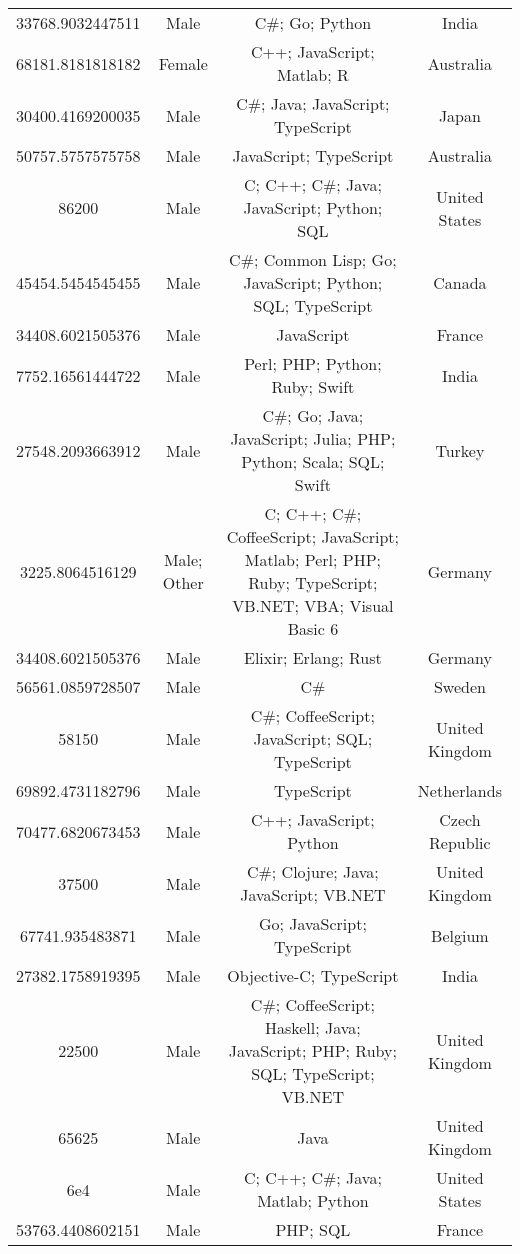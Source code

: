 \begin{center}
\begin{tabular}{ |c|c|c|c| }
33768.9032447511  &  Male  &  C\#; Go; Python  &  India  \\ 
68181.8181818182  &  Female  &  C++; JavaScript; Matlab; R  &  Australia  \\ 
30400.4169200035  &  Male  &  C\#; Java; JavaScript; TypeScript  &  Japan  \\ 
50757.5757575758  &  Male  &  JavaScript; TypeScript  &  Australia  \\ 
86200  &  Male  &  C; C++; C\#; Java; JavaScript; Python; SQL  &  United States  \\ 
45454.5454545455  &  Male  &  C\#; Common Lisp; Go; JavaScript; Python; SQL; TypeScript  &  Canada  \\ 
34408.6021505376  &  Male  &  JavaScript  &  France  \\ 
7752.16561444722  &  Male  &  Perl; PHP; Python; Ruby; Swift  &  India  \\ 
27548.2093663912  &  Male  &  C\#; Go; Java; JavaScript; Julia; PHP; Python; Scala; SQL; Swift  &  Turkey  \\ 
3225.8064516129  &  Male; Other  &  C; C++; C\#; CoffeeScript; JavaScript; Matlab; Perl; PHP; Ruby; TypeScript; VB.NET; VBA; Visual Basic 6  &  Germany  \\ 
34408.6021505376  &  Male  &  Elixir; Erlang; Rust  &  Germany  \\ 
56561.0859728507  &  Male  &  C\#  &  Sweden  \\ 
58150  &  Male  &  C\#; CoffeeScript; JavaScript; SQL; TypeScript  &  United Kingdom  \\ 
69892.4731182796  &  Male  &  TypeScript  &  Netherlands  \\ 
70477.6820673453  &  Male  &  C++; JavaScript; Python  &  Czech Republic  \\ 
37500  &  Male  &  C\#; Clojure; Java; JavaScript; VB.NET  &  United Kingdom  \\ 
67741.935483871  &  Male  &  Go; JavaScript; TypeScript  &  Belgium  \\ 
27382.1758919395  &  Male  &  Objective-C; TypeScript  &  India  \\ 
22500  &  Male  &  C\#; CoffeeScript; Haskell; Java; JavaScript; PHP; Ruby; SQL; TypeScript; VB.NET  &  United Kingdom  \\ 
65625  &  Male  &  Java  &  United Kingdom  \\ 
6e4  &  Male  &  C; C++; C\#; Java; Matlab; Python  &  United States  \\ 
53763.4408602151  &  Male  &  PHP; SQL  &  France  \\ 

\end{tabular}
\end{center}
